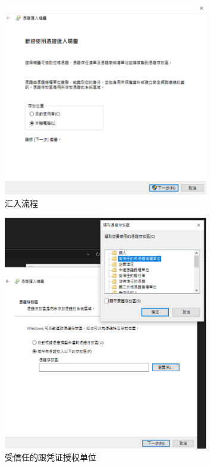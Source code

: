 \begin{figure}[htb]
\centering 
\includegraphics[width=0.80\textwidth]{img/ch1s2m8.png} 
\caption{汇入流程}
\label{Test}
\end{figure}

\begin{figure}[htb]
\centering 
\includegraphics[width=0.80\textwidth]{img/ch1s2m9.png} 
\caption{受信任的跟凭证授权单位}
\label{Test}
\end{figure}

